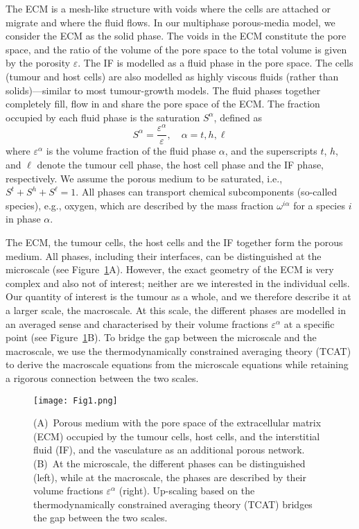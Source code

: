 \documentclass[Times1COL,AMA]{WileyNJDv5} %
\begin{document}
The ECM is a mesh-like structure with voids where the cells are attached or migrate and where the fluid flows.
In our multiphase porous-media model, we consider the ECM as the solid phase.
The voids in the ECM constitute the pore space, and the ratio of the volume of the pore space to the total volume is given by the porosity $\varepsilon$.
The IF is modelled as a fluid phase in the pore space.
The cells (tumour and host cells) are also modelled as highly viscous fluids (rather than solids)---similar to most tumour-growth models. \cite{Sciume2013b}
The fluid phases together completely fill, flow in and share the pore space of the ECM.
The fraction occupied by each fluid phase is the saturation $S^\alpha$, defined as
\begin{equation}
    S^\alpha = \frac{\varepsilon^\alpha}{\varepsilon}, \quad \alpha = t,h,\ell
\end{equation}
where $\varepsilon^\alpha$ is the volume fraction of the fluid phase $\alpha$, and the superscripts $t$, $h$, and $\ell$ denote the tumour cell phase, the host cell phase and the IF phase, respectively.
We assume the porous medium to be saturated, i.e., $S^t + S^h + S^\ell = 1$.
All phases can transport chemical subcomponents (so-called species), e.g., oxygen, which are described by the mass fraction $\omega^{i\alpha}$ for a species $i$ in phase $\alpha$.

The ECM, the tumour cells, the host cells and the IF together form the porous medium.
All phases, including their interfaces, can be distinguished at the microscale (see Figure~\ref{Fig:PorousMedium}A).
However, the exact geometry of the ECM is very complex and also not of interest;
neither are we interested in the individual cells.
Our quantity of interest is the tumour as a whole, and we therefore describe it at a larger scale, the macroscale.
At this scale, the different phases are modelled in an averaged sense and characterised by their volume fractions $\varepsilon^\alpha$ at a specific point (see Figure~\ref{Fig:PorousMedium}B).
To bridge the gap between the microscale and the macroscale, we use
the thermodynamically constrained averaging theory (TCAT) \cite{Gray2014} to derive the macroscale equations from the microscale equations while retaining a rigorous connection between the two scales. \cite{Miller2022}

\begin{figure}[tbp]
    \centering
    \texttt{[image: Fig1.png]}
    \caption{%
        (A)~Porous medium with the pore space of the extracellular matrix (ECM) occupied by the tumour cells, host cells, and the interstitial fluid (IF), and the vasculature as an additional porous network.
        (B)~At the microscale, the different phases can be distinguished (left), while at the macroscale, the phases are described by their volume fractions $\varepsilon^\alpha$ (right).
        Up-scaling based on the thermodynamically constrained averaging theory (TCAT) bridges the gap between the two scales.
    }
    \label{Fig:PorousMedium}
\end{figure}
\end{document}
